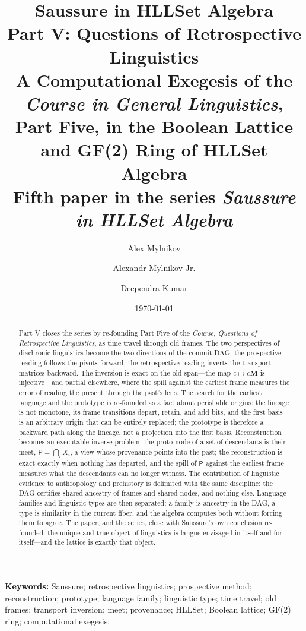 \documentclass[11pt,a4paper]{article}
\title{\textbf{Saussure in HLLSet Algebra}\\[4pt]
\large Part V: Questions of Retrospective Linguistics\\[4pt]
\large A Computational Exegesis of the \textit{Course in General Linguistics},\\
Part Five, in the Boolean Lattice and GF(2) Ring of HLLSet Algebra\\[6pt]
\normalsize Fifth paper in the series \textit{Saussure in HLLSet Algebra}}
\author{Alex Mylnikov \and Alexandr Mylnikov Jr. \and Deependra Kumar}
\date{\today}
\theoremstyle{remark}
\newcommand{\Change}{\ensuremath{\mathbf{M}}}            %
\newcommand{\Proto}{\ensuremath{\mathsf{P}}}             %
\begin{document}
\maketitle

\begin{abstract}
Part V closes the series by re-founding Part Five of the \textit{Course},
\emph{Questions of Retrospective Linguistics}, as time travel through old
frames. The two perspectives of diachronic linguistics become the two
directions of the commit DAG: the prospective reading follows the pivots
forward, the retrospective reading inverts the transport matrices backward.
The inversion is exact on the old span---the map $c \mapsto c\Change$ is
injective---and partial elsewhere, where the spill against the earliest frame
measures the error of reading the present through the past's lens. The search
for the earliest language and the prototype is re-founded as a fact about
perishable origins: the lineage is not monotone, its frame transitions
depart, retain, and add bits, and the first basis is an arbitrary origin
that can be entirely replaced; the prototype is therefore a backward path
along the lineage, not a projection into the first basis. Reconstruction
becomes an executable
inverse problem: the proto-node of a set of descendants is their meet,
$\Proto = \bigcap_i X_i$, a view whose provenance points into the past; the
reconstruction is exact exactly when nothing has departed, and the spill of
$\Proto$ against the earliest frame measures what the descendants can no
longer witness. The contribution of linguistic evidence to anthropology and
prehistory is delimited with the same discipline: the DAG certifies shared
ancestry of frames and shared nodes, and nothing else. Language families and
linguistic types are then separated: a family is ancestry in the DAG, a type
is similarity in the current fiber, and the algebra computes both without
forcing them to agree. The paper, and the series, close with Saussure's own
conclusion re-founded: the unique and true object of linguistics is langue
envisaged in itself and for itself---and the lattice is exactly that object.
\end{abstract}

\noindent\textbf{Keywords:} Saussure; retrospective linguistics; prospective
method; reconstruction; prototype; language family; linguistic type; time
travel; old frames; transport inversion; meet; provenance; HLLSet; Boolean
lattice; GF(2) ring; computational exegesis.

\end{document}
